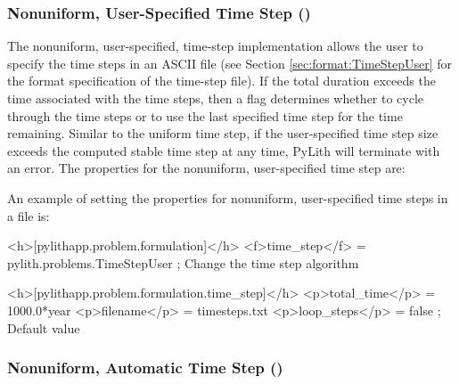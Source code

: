 \subsubsection{Nonuniform, User-Specified Time Step ()}

The nonuniform, user-specified, time-step implementation allows the
user to specify the time steps in an ASCII file (see Section
\vref{sec:format:TimeStepUser} for the format specification of the
time-step file). If the total duration exceeds the time associated
with the time steps, then a flag determines whether to cycle through
the time steps or to use the last specified time step for the time
remaining. Similar to the uniform time step, if the user-specified
time step size exceeds the computed stable time step at any time,
PyLith will terminate with an error.  The properties for the
nonuniform, user-specified time step are:
\begin{inventory}
\end{inventory}
An example of setting the properties for nonuniform, user-specified
time steps in a  file is:
\begin{cfg}
<h>[pylithapp.problem.formulation]</h>
<f>time_step</f> = pylith.problems.TimeStepUser ; Change the time step algorithm

<h>[pylithapp.problem.formulation.time_step]</h>
<p>total_time</p> = 1000.0*year
<p>filename</p> = timesteps.txt
<p>loop_steps</p> = false ; Default value
\end{cfg}

\subsubsection{Nonuniform, Automatic Time Step ()}

